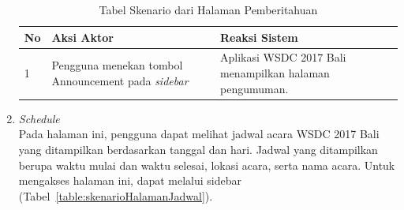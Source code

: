 \begin{enumerate}
		\begin{table}[H]
			\centering
			\begin{tabular}{|p{0.5cm}|p{7cm}|p{7cm}|}
				\hline
				No & Aksi Aktor                               & Reaksi Sistem                                          \\ \hline
				1  & Pengguna menekan tombol Announcement pada \textit{sidebar} & Aplikasi WSDC 2017 Bali menampilkan halaman pengumuman. \\ \hline
			\end{tabular}
			\caption{Tabel Skenario dari Halaman Pemberitahuan}
			\label{table:skenarioHalamanPemberitahuan}
		\end{table}
	\item \textit{Schedule} \\ 
	Pada halaman ini, pengguna dapat melihat jadwal acara WSDC 2017 Bali yang ditampilkan berdasarkan tanggal dan hari. Jadwal yang ditampilkan berupa waktu mulai dan waktu selesai, lokasi acara, serta nama acara. Untuk mengakses halaman ini, dapat melalui sidebar (Tabel~\ref{table:skenarioHalamanJadwal}).

\end{enumerate}
